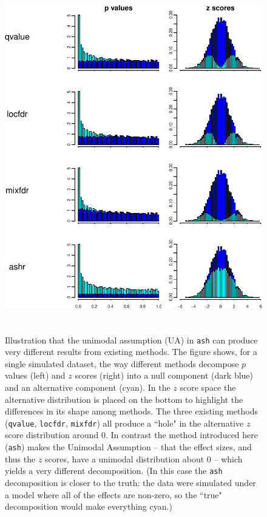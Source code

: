\documentclass[11pt]{article}
\def\qvalue{{\tt qvalue}\xspace}
\def\locfdr{{\tt locfdr}\xspace}
\def\mixfdr{{\tt mixfdr}\xspace}
\def\ash{{\tt ash}\xspace}
\begin{document}
\begin{figure}
\center \includegraphics[height=6in]{../analysis/figure/makefig_FDReg.Rmd/decomp_ZA-1.pdf}
\caption{Illustration that the unimodal assumption (UA) in \ash can produce very different results from existing methods.
The figure shows, for a single simulated dataset, the way different methods decompose $p$ values (left) and $z$ scores (right) into a null component (dark blue) and an alternative component (cyan). In the $z$ score space the alternative distribution is placed on the bottom to highlight the differences in its shape among methods.
The three existing methods (\qvalue, \locfdr, \mixfdr) all produce a ``hole" in the alternative $z$ score distribution around 0.
In contrast the method introduced here (\ash) makes the Unimodal Assumption -- that the effect sizes, and thus the $z$ scores, have a unimodal distribution about 0 -- which yields a very different decomposition. (In this case the \ash decomposition is closer to the truth: the data were simulated under a model where all of the effects are non-zero, so the ``true" decomposition would make everything cyan.)} \label{fig:ZA}
\end{figure}
\end{document}
